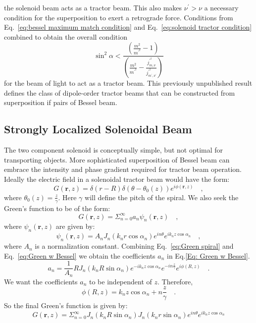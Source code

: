 the solenoid beam acts as a tractor beam. This also makes $\nu^{\prime} > \nu$ a necessary condition for the superposition to exert a retrograde force. Conditions from Eq.~\eqref{eq:bessel maximum match condition} and Eq.~\eqref{eq:solenoid tractor condition} combined to obtain the overall condition
\begin{equation}
\label{eq:convergence angle limit}
\sin ^{2} \alpha < \frac{\left(\frac{m^2}{m^{\prime ^{2}}}-1\right)}{\left(\frac{m^2}{m^{\prime ^{2}}} - \frac{j_{m,\nu}^{\prime ^{2}}}{j^{\prime ^{2}}_{m^{\prime},\nu ^{\prime}}}\right)}
\end{equation}
 for the beam of light to act as a tractor beam. This previously unpublished result defines the class of dipole-order tractor beams that can be constructed from superposition if pairs of Bessel beam.


\subsection{Strongly Localized Solenoidal Beam}

The two component solenoid is conceptually simple, but not optimal for transporting objects. More sophisticated superposition of Bessel beam can embrace the intensity and phase gradient required for tractor beam operation. Ideally the  electric field in a solenoidal tractor beam would have the form:
\begin{equation}\label{eq:Green spiral}
G(\mathbf{r}, z) = \delta (r-R)\delta (\theta - \theta_{0}(z)) e^{i\phi (\mathbf{r}, z)} \quad ,
\end{equation}
where $\theta_{0}(z) = \frac{z}{\gamma}$. Here $\gamma$ will define the pitch of the spiral. We also seek the Green's function to be of the form:
\begin{equation}\label{eq:Green w Bessel}
G(\mathbf{r}, z) = \Sigma _{n=0}^{\infty}a_n \psi _{n}(\mathbf{r},z) \quad ,
\end{equation}
where $\psi_{n} (\mathbf{r}, z)$ are given by:
\begin{equation}\label{Eq: Bessel fn}
\psi_{n}(\mathbf{r}, z) = A_{n}J_{n}(k_{n}r \cos\alpha _n)e^{in\theta}e^{ik_{n}z\cos\alpha _n} \quad ,
\end{equation}
where $A_n$ is a normalization constant. Combining Eq.~\eqref{eq:Green spiral} and Eq.~\eqref{eq:Green w Bessel} we obtain the coefficients $a_n$ in Eq.\ref{Eq: Green w Bessel}. 
\begin{equation}\label{Eq: Green coeff}
a_{n} = \frac{1}{A_n}R J_{n}(k_n R \sin\alpha _n)e^{-i k_n z \cos\alpha _n}e^{-in\frac{z}{\gamma}}e^{i\phi(R,z)} \quad .
\end{equation}
We want the coefficients $a_n$ to be independent of $z$. Therefore,
\begin{equation}\label{Eq: phi reln.}
\phi(R,z) = k_nz\cos\alpha _n + n\frac{z}{\gamma} \quad .
\end{equation}
So the final Green's function is given by:
\begin{equation}\label{Eq: Green final}
G(\textbf{r},z) = \Sigma _{n=0}^{\infty} J_n(k_n R \sin\alpha _n)J_{n}(k_n r \sin\alpha _n) e^{in\theta}e^{ik_n z\cos\alpha _n}
\end{equation}

